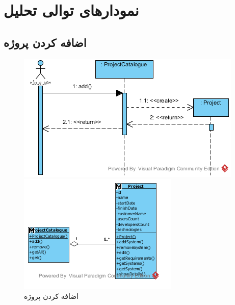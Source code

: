 \chapter{نمودارهای توالی تحلیل}

\newpage
\section{اضافه کردن پروژه}
\begin{figure}[H]
	\centering
	\includegraphics[scale=1]{img/sequence-analysis/AddProjectToOrganization}
	
	
	\includegraphics[scale=1]{img/sequence-analysis/AddProjectToOrganizationC}
	\caption{اضافه کردن پروژه}
\end{figure}

